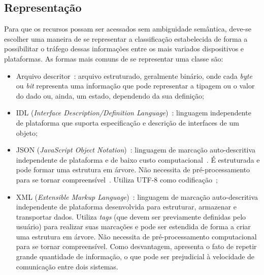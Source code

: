 \subsection{Representação}

Para que os recursos possam ser acessados sem ambiguidade semântica, deve-se escolher uma maneira de se representar a classificação estabelecida de forma a possibilitar o tráfego dessas informações entre os mais variados dispositivos e plataformas. As formas mais comuns de se representar uma classe são:

\begin{itemize}
	\item Arquivo descritor~\cite{usb3spec}: arquivo estruturado, geralmente binário, onde cada \emph{byte} ou \emph{bit} representa uma informação que pode representar a tipagem ou o valor do dado ou, ainda, um estado, dependendo da sua definição;
	

	
	\item IDL (\emph{Interface Description/Definition Language})~\cite{davidIDL}: linguagem independente de plataforma que suporta especificação e descrição de interfaces de um objeto;

	\item JSON (\emph{JavaScript Object Notation})~\cite{json}: linguagem de marcação auto-descritiva independente de plataforma e de baixo custo computacional~\cite{comparativojson}. É estruturada e pode formar uma estrutura em árvore. Não necessita de pré-processamento para se tornar compreensível~\cite{comparativojson}. Utiliza UTF-8 como codificação~\cite{utf8};
	

	\item XML (\emph{Extensible Markup Language})~\cite{xml}: linguagem de marcação auto-descritiva independente de plataforma desenvolvida para estruturar, armazenar e transportar dados. Utiliza \emph{tags} (que devem ser previamente definidas pelo usuário) para realizar suas marcações e pode ser estendida de forma a criar uma estrutura em árvore. Não necessita de pré-processamento computacional para se tornar compreensível. Como desvantagem, apresenta o fato de repetir grande quantidade de informação, o que pode ser prejudicial à velocidade de comunicação entre dois sistemas.
\end{itemize}

